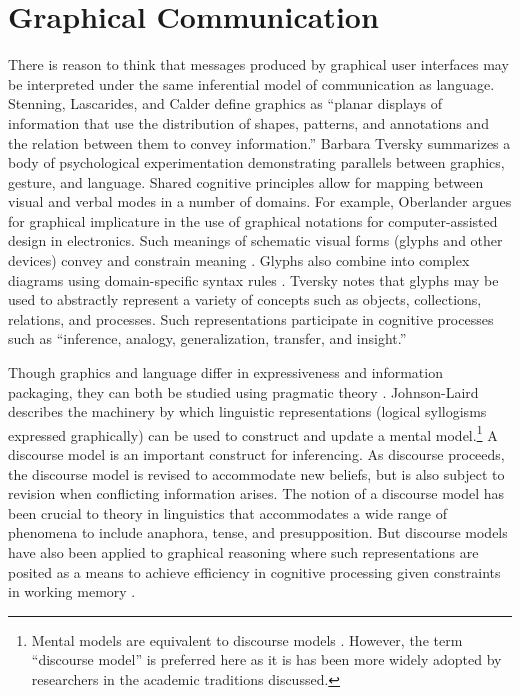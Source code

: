 \section{Graphical Communication}
\label{graphicalcommunication}


There is reason to think that messages produced by graphical user interfaces may be interpreted under the same inferential model of communication as language. Stenning, Lascarides, and Calder  \citeyearpar[p. 476]{Stenning:2006wu}  define graphics as ``planar displays of information that use the distribution of shapes, patterns, and annotations and the relation between them to convey information.'' Barbara Tversky  \citeyearpar{Tversky:2004wj,Tversky:2010ww}  summarizes a body of psychological experimentation demonstrating parallels between graphics, gesture, and language. Shared cognitive principles allow for mapping between visual and verbal modes in a number of domains. For example, Oberlander  \citeyearpar{Oberlander:1995vv}  argues for graphical implicature in the use of graphical notations for computer-assisted design in electronics. Such meanings of schematic visual forms (glyphs and other devices) convey and constrain meaning  \citep{Tversky:2010ww}.  Glyphs also combine into complex diagrams using domain-specific syntax rules  \citep*{Tversky:1999ta}.  Tversky  \citeyearpar{Tversky:2010ww}  notes that glyphs may be used to abstractly represent a variety of concepts such as objects, collections, relations, and processes. Such representations participate in cognitive processes such as ``inference, analogy, generalization, transfer, and insight.''  \citep[p. 2]{Tversky:2010ww} 

Though graphics and language differ in expressiveness and information packaging, they can both be studied using pragmatic theory  \citep*{Stenning:2002vd,Stenning:1995ka}.  Johnson-Laird  \citeyearpar{JohnsonLaird:1989uj}  describes the machinery by which linguistic representations (logical syllogisms expressed graphically) can be used to construct and update a mental model.\footnote{Mental models are equivalent to discourse models  \citep*{JohnsonLaird:1980uf}.  However, the term ``discourse model'' is preferred here as it is has been more widely adopted by researchers in the academic traditions discussed.} A discourse model is an important construct for inferencing. As discourse proceeds, the discourse model is revised to accommodate new beliefs, but is also subject to revision when conflicting information arises. The notion of a discourse model has been crucial to theory in linguistics that accommodates a wide range of phenomena to include anaphora, tense, and presupposition. But discourse models have also been applied to graphical reasoning where such representations are posited as a means to achieve efficiency in cognitive processing given constraints in working memory  \citep*{Stenning:1995ka}. 

